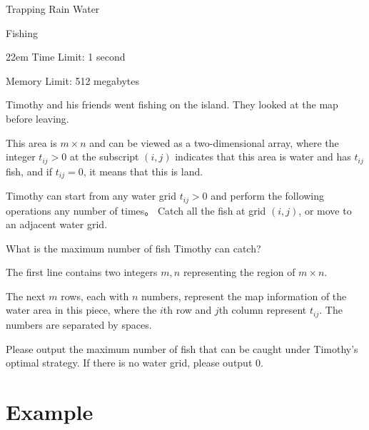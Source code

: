 \documentclass{xcpc}
\begin{document}
\begin{problem}{Trapping Rain Water}
	\end{problem}
	
	\begin{problem}{Fishing}
		\begin{boxedminipage}[c][1cm][t]{22em} 
			Time Limit: 1 second
			
			Memory Limit: 512 megabytes
		\end{boxedminipage}
		
		Timothy and his friends went fishing on the island. They looked at the map before leaving.
		
		This area is $m \times n$ and can be viewed as a two-dimensional array, where the integer $t_{ij}>0$ at the subscript $(i, j)$ indicates that this area is water and has $t_{ij}$ fish, and if $t_{ij}=0$, it means that this is land.
		
		Timothy can start from any water grid $t_{ij}>0$ and perform the following operations any number of times。 Catch all the fish at grid $(i, j)$, or move to an adjacent water grid.
		
		What is the maximum number of fish Timothy can catch?
	
	
	\begin{inputdes}
		The first line contains two integers $m,n$ representing the region of $m\times n$.
		
		The next $m$ rows, each with $n$ numbers, represent the map information of the water area in this piece, where the $i$th row and $j$th column represent $t_{ij}$. The numbers are separated by spaces.
	\end{inputdes}
	
	\begin{outputdes}
		Please output the maximum number of fish that can be caught under Timothy's optimal strategy. If there is no water grid, please output 0.
	\end{outputdes}
	
	\section*{Example}
	

\end{problem}
\end{document}
